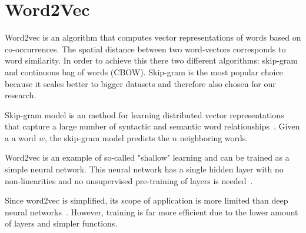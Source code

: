 \section{Word2Vec}
\label{sec:word2vec}
Word2vec is an algorithm that computes vector representations of words based on co-occurrences. The spatial distance between two word-vectors corresponds to word similarity. In order to achieve this there two different algorithms: skip-gram and continuous bag of words (CBOW). Skip-gram is the most popular choice because it scales better to bigger datasets and therefore also chosen for our research. 

Skip-gram model is an method for learning distributed vector representations that capture a large number of syntactic and semantic word relationships~\cite{mikolov2013distributed}. Given a a word $w$, the skip-gram model predicts the $n$ neighboring words.

Word2vec is an example of so-called "shallow" learning and can be trained as a simple neural network. This neural network has a single hidden layer with no non-linearities and no unsupervised pre-training of layers is needed~\cite{wang2014introduction}.

Since word2vec is simplified, its scope of application is more limited than deep neural networks~\cite{bengio2007scaling}. However, training is far more efficient due to the lower amount of layers and simpler functions.